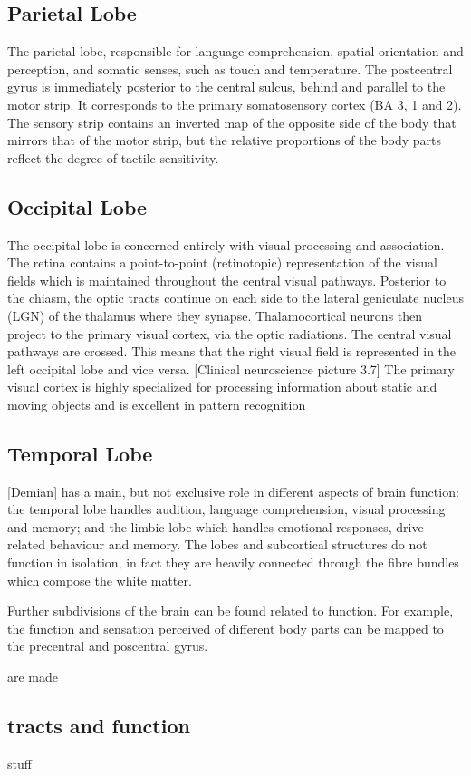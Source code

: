 \subsection{Parietal Lobe}
The parietal lobe, responsible for language comprehension, spatial orientation and perception, and somatic senses, such as touch and temperature.
The postcentral gyrus is immediately posterior to the central sulcus, behind and parallel to the motor strip.
It corresponds to the primary somatosensory cortex (BA 3, 1 and 2).
The sensory strip contains an inverted map of the opposite side of the body that mirrors that of the motor strip, but the relative proportions of the body parts reflect the degree of tactile sensitivity.

\subsection{Occipital Lobe}
The occipital lobe is concerned entirely with visual processing and association.
The retina contains a point-to-point (retinotopic) representation of the visual fields which is maintained throughout the central visual pathways.
Posterior to the chiasm, the optic tracts continue on each side to the lateral geniculate nucleus (LGN) of the thalamus where they synapse.
Thalamocortical neurons then project to the primary visual cortex, via the optic radiations.
The central visual pathways are crossed. This means that the right visual field is represented in the left occipital lobe and vice versa.
[Clinical neuroscience picture 3.7]
The primary visual cortex is highly specialized for processing information about static and moving objects and is excellent in pattern recognition

\subsection{Temporal Lobe}



[Demian]
has a main, but not exclusive role in different aspects of brain function:
the temporal lobe handles audition, language comprehension, visual processing and memory;
and the limbic lobe which handles emotional responses,  drive-related behaviour and memory.
The lobes and subcortical structures do not function in isolation, in fact they are heavily connected through the fibre bundles which compose the white matter.

Further subdivisions of the brain can be found related to function.
For example, the function and sensation perceived of different body parts can be mapped to the precentral and poscentral gyrus.

are made 


\subsection{tracts and function}
stuff
